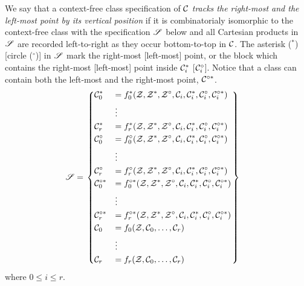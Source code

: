 \documentclass[12pt, a4paper, twoside]{report}
\begin{document}
\begin{definition}
  We say that a context-free class specification of $\mathcal{C}$ \emph{tracks the right-most and the left-most point by its vertical position} if it is combinatorialy isomorphic to the context-free class with the specification $\mathscr{S}$ below and all Cartesian products in $\mathscr{S}$ are recorded left-to-right as they occur bottom-to-top in $\mathcal{C}$. The asterisk (${}^*$) [circle (${}^\circ$)] in $\mathscr{S}$ mark the right-most [left-most] point, or the block which contains the right-most [left-most] point inside $\mathcal{C}_i^*$ [$\mathcal{C}_i^\circ$]. Notice that a class can contain both the left-most and the right-most point, $\mathcal{C}^{\circ*}$.
  \begin{align}
\mathscr{S} &=  \begin{rcases}\begin{dcases}
  \mathcal{C}_0^* &= f_0^*(\mathcal{Z},\mathcal{Z}^*,\mathcal{Z}^\circ,\mathcal{C}_i, \mathcal{C}_i^*,\mathcal{C}_i^\circ, \mathcal{C}_i^{\circ *})\\
       &\vdots\\
  \mathcal{C}_r^* &= f_r^*(\mathcal{Z},\mathcal{Z}^*,\mathcal{Z}^\circ,\mathcal{C}_i, \mathcal{C}_i^*,\mathcal{C}_i^\circ, \mathcal{C}_i^{\circ *})\\
  \mathcal{C}_0^\circ &= f_0^\circ(\mathcal{Z},\mathcal{Z}^*,\mathcal{Z}^\circ,\mathcal{C}_i, \mathcal{C}_i^*,\mathcal{C}_i^\circ, \mathcal{C}_i^{\circ *})\\
       &\vdots\\
  \mathcal{C}_r^\circ &= f_r^\circ(\mathcal{Z},\mathcal{Z}^*,\mathcal{Z}^\circ,\mathcal{C}_i, \mathcal{C}_i^*,\mathcal{C}_i^\circ, \mathcal{C}_i^{\circ *})\\
  \mathcal{C}_0^{\circ*} &= f_0^{\circ*}(\mathcal{Z},\mathcal{Z}^*,\mathcal{Z}^\circ,\mathcal{C}_i, \mathcal{C}_i^*,\mathcal{C}_i^\circ, \mathcal{C}_i^{\circ *})\\
       &\vdots\\
  \mathcal{C}_r^{\circ*} &= f_r^{\circ*}(\mathcal{Z},\mathcal{Z}^*,\mathcal{Z}^\circ,\mathcal{C}_i, \mathcal{C}_i^*,\mathcal{C}_i^\circ, \mathcal{C}_i^{\circ *})\\
  \mathcal{C}_0 &= f_0(\mathcal{Z},\mathcal{C}_0,\ldots,\mathcal{C}_r)\\
       &\vdots\\
  \mathcal{C}_r &= f_r(\mathcal{Z},\mathcal{C}_0,\ldots,\mathcal{C}_r)
       \end{dcases}
     \end{rcases}
         \label{eq:combspecS}
  \end{align}
  where $0 \leq i \leq r$. 
 \end{definition}
\end{document}
